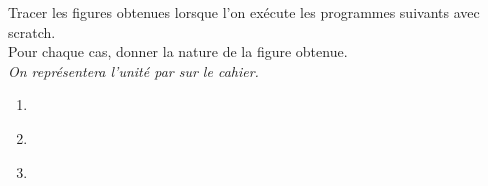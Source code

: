 \begin{colonne*exercice}
\begin{exercice} %
   Tracer les figures obtenues lorsque l'on exécute les programmes suivants avec scratch. \\
   Pour chaque cas, donner la nature de la figure obtenue. \\
   {\it On représentera l'unité par  sur le cahier.}
   \bigskip
   \begin{enumerate}
      \item
      \begin{center}
         \begin{scratch}
               {
               }
         \end{scratch}
      \end{center}
      \bigskip
      \item 
      \begin{center}
         \begin{scratch}
               {
               }
         \end{scratch} \\ [3mm]
      \end{center}
      \bigskip
      \item 
      \begin{center}
         \begin{scratch}
               {
               }
         \end{scratch}
      \end{center}
   \end{enumerate}
\end{exercice}


\end{colonne*exercice}
